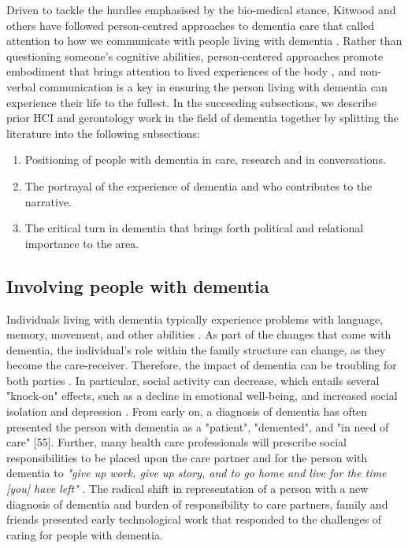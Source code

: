 Driven to tackle the hurdles emphasised by the bio-medical stance, Kitwood and others have followed person-centred approaches to dementia care that called attention to how we communicate with people living with dementia \citep{kitwood_towards_1992, dewing_personhood_2008}. Rather than questioning someone's cognitive abilities, person-centered approaches promote embodiment that brings attention to lived experiences of the body \citep{kontos_embodiment_2013}, and non-verbal communication is a key in ensuring the person living with dementia can experience their life to the fullest. In the succeeding subsections, we describe prior HCI and gerontology work in the field of dementia together by splitting the literature into the following subsections:
\begin{enumerate}
    \item Positioning of people with dementia in care, research and in conversations.
    \item The portrayal of the experience of dementia and who contributes to the narrative.
    \item The critical turn in dementia that brings forth political and relational importance to the area.
\end{enumerate}

\subsection{Involving people with dementia}
Individuals living with dementia typically experience problems with language, memory, movement, and other abilities \citep{bature_signs_2017}. As part of the changes that come with dementia, the individual's role within the family structure can change, as they become the care-receiver. Therefore, the impact of dementia can be troubling for both parties \citep{ryan_dementia_2009}. In particular, social activity can decrease, which entails several "knock-on" effects, such as a decline in emotional well-being, and increased social isolation and depression \citep{cohen-mansfield_utilization_2006,lee_just_2003,susan_krauss_whitbourne_adult_2011}. From early on, a diagnosis of dementia has often presented the person with dementia as a "patient", "demented", and "in need of care" [55]. Further, many health care professionals will prescribe social responsibilities to be placed upon the care partner and for the person with dementia to \textit{"give up work, give up story, and to go home and live for the time [you] have left"} \citep{doi:10.1177/1471301214548136}. The radical shift in representation of a person with a new diagnosis of dementia and burden of responsibility to care partners, family and friends presented early technological work that responded to the challenges of caring for people with dementia. 

